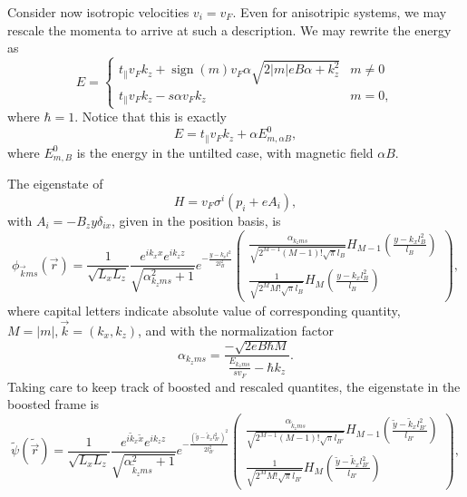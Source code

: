 Consider now isotropic velocities \( v_i = v_F \).
Even for anisotripic systems, we may rescale the momenta to arrive at such a description.
We may rewrite the energy as
\[
  E =
  \begin{cases}
    t_{\parallel} v_F k_z + \operatorname{sign}(m) v_F \alpha \sqrt{2 |m| e B \alpha + k_z^2} & m\neq 0\\
    t_{\parallel} v_F k_z - s \alpha v_F k_z & m=0,
  \end{cases}
\]
where \( \hbar = 1 \).
Notice that this is exactly
\[
E = t_{\parallel} v_F k_z + \alpha E^0_{m, \alpha B},
\]
where \( E^0_{m, B} \) is the energy in the untilted case, with magnetic field \( \alpha B \).

The eigenstate of
\[
H = v_{F} \sigma ^{i} ( p_{i} + e A_{i} ),
\]
with \(A_{i} = - B_{z} y \delta _{i x}\), given in the position basis, is
\begin{equation}
  \phi _{\vec{k} m s}(\vec{r}) = \frac{1}{\sqrt{L_xL_z}}
  \frac{e^{ik_x x}e^{ik_z z}}{\sqrt{\alpha _{k_z m s}^2 + 1}}
  e^{-\frac{y-k_x l^2}{2 l_B^2}}
  \begin{pmatrix}
    \frac{\alpha _{k_z m s}}{\sqrt{2^{M-1} (M-1)! \sqrt{\pi } l_B}} H_{M-1}\left( \frac{y-k_x l_B^2}{l_B} \right)\\
    \frac{1}{\sqrt{2^M M! \sqrt{\pi } l_B}} H_M \left( \frac{y-k_x l_B^2}{l_B} \right)
  \end{pmatrix},
\end{equation}
where capital letters indicate absolute value of corresponding quantity, $M=|m|, \vec{k} = (k_x, k_z)$, and with the normalization factor
\begin{equation}
  \alpha _{k_z m s} = \frac{-\sqrt{2eB\hbar M}}{\frac{E_{k_z m s}}{s v_{F}} - \hbar  k_z}.
\end{equation}
Taking care to keep track of boosted and rescaled quantites, the eigenstate in the boosted frame is
\begin{equation}
  \label{eq:58}
  \tilde{\psi}(\tilde{\vec{r}}) =
  \frac{1}{\sqrt{L_xL_z}}
  \frac{e^{i \tilde{k}_x \tilde{x}}e^{i k_z z}}{\sqrt{\alpha _{\tilde{k}_z m s}^2 + 1}}
  e^{-\frac{\left(\tilde{y} - \tilde{k}_x l_{B'}^2\right)^2}{2 l_{B'}^2}}
  \begin{pmatrix}
    \frac{\alpha _{\tilde{k}_z m s}}{\sqrt{2^{M-1} (M-1)! \sqrt{\pi } l_{B'}}} H_{M-1}\left( \frac{\tilde{y} - \tilde{k}_x l_{B'}^2}{l_{B'}} \right)\\
    \frac{1}{\sqrt{2^M M! \sqrt{\pi } l_{B'}}} H_M \left( \frac{\tilde{y} - \tilde{k}_x l_{B'}^2}{l_{B'}} \right)
  \end{pmatrix},
\end{equation}
